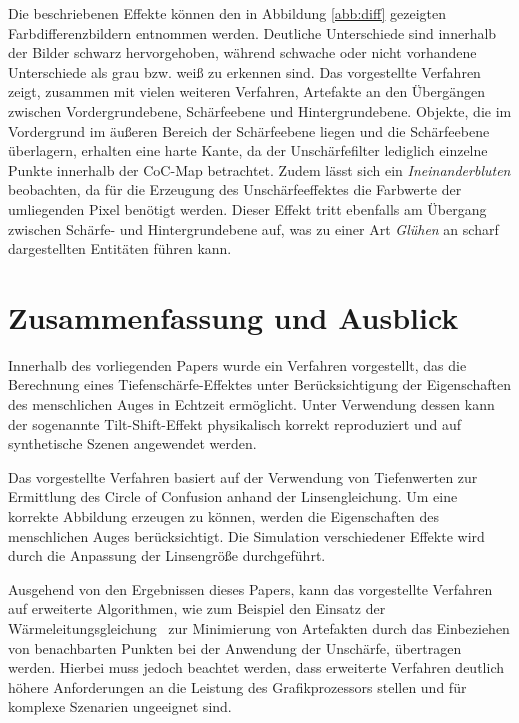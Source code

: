 \documentclass{acmsiggraph}                     %
\begin{document}
Die beschriebenen Effekte können den in Abbildung \ref{abb:diff} gezeigten Farbdifferenzbildern entnommen werden. Deutliche Unterschiede sind innerhalb der Bilder schwarz hervorgehoben, während schwache oder nicht vorhandene Unterschiede als grau bzw. weiß zu erkennen sind. Das vorgestellte Verfahren zeigt, zusammen mit vielen weiteren Verfahren, Artefakte an den Übergängen zwischen Vordergrundebene, Schärfeebene und Hintergrundebene. Objekte, die im Vordergrund im äußeren Bereich der Schärfeebene liegen und die Schärfeebene überlagern, erhalten eine harte Kante, da der Unschärfefilter lediglich einzelne Punkte innerhalb der CoC-Map betrachtet. Zudem lässt sich ein \emph{Ineinanderbluten} beobachten, da für die Erzeugung des Unschärfeeffektes die Farbwerte der umliegenden Pixel benötigt werden. Dieser Effekt tritt ebenfalls am Übergang zwischen Schärfe- und Hintergrundebene auf, was zu einer Art \emph{Glühen} an scharf dargestellten Entitäten führen kann.

\section{Zusammenfassung und Ausblick}

Innerhalb des vorliegenden Papers wurde ein Verfahren vorgestellt, das die Berechnung eines Tiefenschärfe-Effektes unter Berücksichtigung der Eigenschaften des menschlichen Auges in Echtzeit ermöglicht. Unter Verwendung dessen kann der sogenannte Tilt-Shift-Effekt physikalisch korrekt reproduziert und auf synthetische Szenen angewendet werden.

Das vorgestellte Verfahren basiert auf der Verwendung von Tiefenwerten zur Ermittlung des Circle of Confusion anhand der Linsengleichung. Um eine korrekte Abbildung erzeugen zu können, werden die Eigenschaften des menschlichen Auges berücksichtigt. Die Simulation verschiedener Effekte wird durch die Anpassung der Linsengröße durchgeführt.

Ausgehend von den Ergebnissen dieses Papers, kann das vorgestellte Verfahren auf erweiterte Algorithmen, wie zum Beispiel den Einsatz der Wärmeleitungsgleichung~\cite{Bertalmio:2004lq,Kass:2006dq} zur Minimierung von Artefakten durch das Einbeziehen von benachbarten Punkten bei der Anwendung der Unschärfe, übertragen werden. Hierbei muss jedoch beachtet werden, dass erweiterte Verfahren deutlich höhere Anforderungen an die Leistung des Grafikprozessors stellen und für komplexe Szenarien ungeeignet sind.



\nocite{*}

\end{document}
